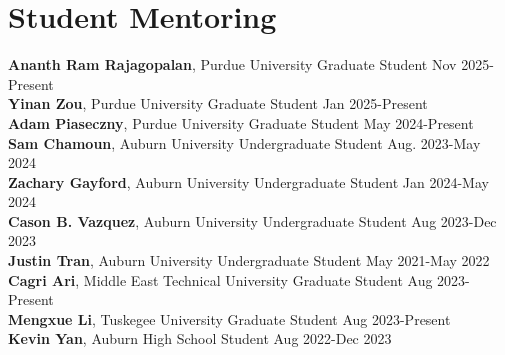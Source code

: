 \documentclass[letterpaper,11pt]{article}
\begin{document}
\section*{Student Mentoring}
{\bf  Ananth Ram Rajagopalan}, Purdue University Graduate Student \hfill Nov 2025-Present \\
{\bf Yinan Zou}, Purdue University Graduate Student \hfill Jan 2025-Present \\
{\bf Adam Piaseczny}, Purdue University Graduate Student \hfill May 2024-Present \\
{\bf Sam Chamoun}, Auburn University Undergraduate Student \hfill Aug. 2023-May 2024 \\
{\bf Zachary Gayford}, Auburn University Undergraduate Student \hfill Jan 2024-May 2024 \\
{\bf Cason B. Vazquez}, Auburn University Undergraduate Student \hfill Aug 2023-Dec 2023 \\
{\bf Justin Tran}, Auburn University Undergraduate Student \hfill May 2021-May 2022 \\
{\bf Cagri Ari}, Middle East Technical University Graduate Student \hfill Aug 2023-Present \\
{\bf Mengxue Li}, Tuskegee University Graduate Student \hfill Aug 2023-Present \\
{\bf Kevin Yan}, Auburn High School Student \hfill Aug 2022-Dec 2023 \\
\end{document}
